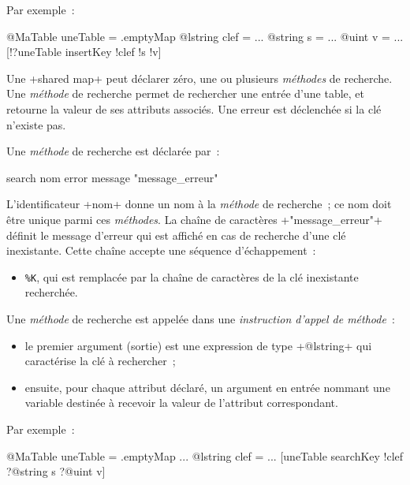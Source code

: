 Par exemple~:
\begin{galgas}
@MaTable uneTable = .emptyMap
@lstring clef = ...
@string s = ...
@uint v = ...
[!?uneTable insertKey !clef !s !v]
\end{galgas}












Une \ggs+shared map+ peut déclarer zéro, une ou plusieurs \emph{méthodes} de recherche. Une \emph{méthode} de recherche permet de rechercher une entrée d'une table, et retourne la valeur de ses attributs associés. Une erreur est déclenchée si la clé n'existe pas.


Une \emph{méthode} de recherche est déclarée par~:


\begin{galgas}
search nom error message "message_erreur"
\end{galgas}

L'identificateur \ggs+nom+ donne un nom à la \emph{méthode} de recherche~; ce nom doit être unique parmi ces \emph{méthodes}. La chaîne de caractères \ggs+"message_erreur"+ définit le message d'erreur qui est affiché en cas de recherche d'une clé inexistante. Cette chaîne accepte une séquence d'échappement~:
\begin{itemize}
  \item \texttt{\%K}, qui est remplacée par la chaîne de caractères de la clé inexistante recherchée.
\end{itemize}


Une \emph{méthode} de recherche est appelée dans une \emph{instruction d'appel de méthode}~:
\begin{itemize}
  \item le premier argument (sortie) est une expression de type \ggs+@lstring+ qui caractérise la clé à rechercher~;
  \item ensuite, pour chaque attribut déclaré, un argument en entrée nommant une variable destinée à recevoir la valeur de l'attribut correspondant.
\end{itemize}

Par exemple~:
\begin{galgas}
@MaTable uneTable = .emptyMap
...
@lstring clef = ...
[uneTable searchKey !clef ?@string s ?@uint v]
\end{galgas}


